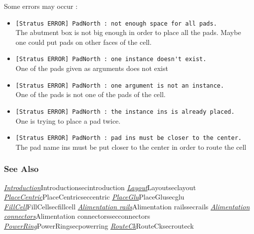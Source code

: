 Some errors may occur :
\begin{itemize}
    \item \verb-[Stratus ERROR] PadNorth : not enough space for all pads.-\\The abutment box is not big enough in order to place all the pads. Maybe one could put pads on other faces of the cell.
    \item \verb-[Stratus ERROR] PadNorth : one instance doesn't exist.-\\One of the pads given as arguments does not exist
    \item \verb-[Stratus ERROR] PadNorth : one argument is not an instance.-\\One of the pads is not one of the pads of the cell.
    \item \verb-[Stratus ERROR] PadNorth : the instance ins is already placed.-\\One is trying to place a pad twice.
    \item \verb-[Stratus ERROR] PadNorth : pad ins must be closer to the center.-\\The pad name ins must be put closer to the center in order to route the cell
\end{itemize}

\begin{htmlonly}

\subsubsection{See Also}

\hyperref[ref]{\emph{Introduction}}{}{Introduction}{secintroduction}
\hyperref[ref]{\emph{Layout}}{}{Layout}{seclayout}
\hyperref[ref]{\emph{PlaceCentric}}{}{PlaceCentric}{seccentric}
\hyperref[ref]{\emph{PlaceGlu}}{}{PlaceGlu}{secglu}
\hyperref[ref]{\emph{FillCell}}{}{FillCell}{secfillcell}
\hyperref[ref]{\emph{Alimentation rails}}{}{Alimentation rails}{secrails}
\hyperref[ref]{\emph{Alimentation connectors}}{}{Alimentation connectors}{secconnectors}
\hyperref[ref]{\emph{PowerRing}}{}{PowerRing}{secpowerring}
\hyperref[ref]{\emph{RouteCk}}{}{RouteCk}{secrouteck}

\end{htmlonly}
